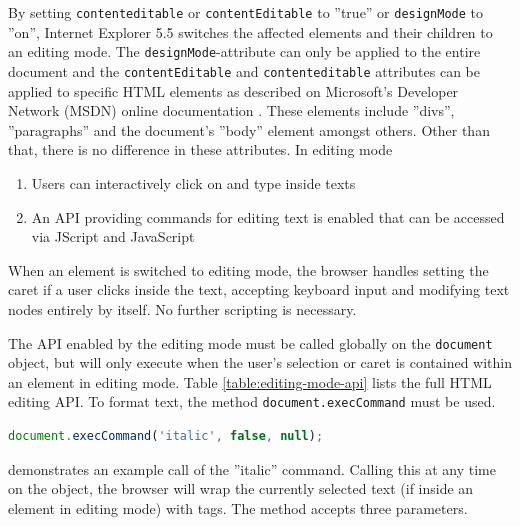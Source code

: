 By setting \texttt{contenteditable} or \texttt{contentEditable} to ''true'' or \texttt{designMode} to ''on'', Internet Explorer 5.5 switches the affected elements and their children to an editing mode. The \texttt{designMode}-attribute can only be applied to the entire document and the \texttt{contentEditable} and \texttt{contenteditable} attributes can be applied to specific HTML elements as described on Microsoft's Developer Network (MSDN) online documentation \cite{ac2}. These elements include ''divs'', ''paragraphs'' and the document's ''body'' element amongst others. Other than that, there is no difference in these attributes. In editing mode


\begin{enumerate}
\item Users can interactively click on and type inside texts
\item An API providing commands for editing text is enabled that can be accessed via JScript and JavaScript
\end{enumerate}

When an element is switched to editing mode, the browser handles setting the caret if a user clicks inside the text, accepting keyboard input and modifying text nodes entirely by itself. No further scripting is necessary.

The API enabled by the editing mode must be called globally on the \texttt{document} object, but will only execute when the user's selection or caret is contained within an element in editing mode. Table \ref{table:editing-mode-api} lists the full HTML editing API. To format text, the method \texttt{document.execCommand} must be used.

\begin{lstlisting}[language=JavaScript, caption=Emphasizing text using the HTML editing API, label=lst:execcommand-italics]
document.execCommand('italic', false, null);
\end{lstlisting}

 demonstrates an example call of the ''italic'' command. Calling this at any time on the  object, the browser will wrap the currently selected text (if inside an element in editing mode) with  tags. The method accepts three parameters.

